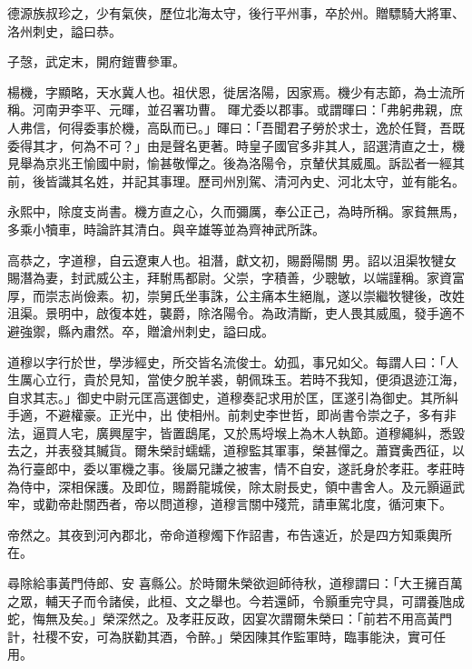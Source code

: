 \begin{pinyinscope}
 德源族叔珍之，少有氣俠，歷位北海太守，後行平州事，卒於州。贈驃騎大將軍、洛州刺史，謚曰恭。



 子愨，武定末，開府鎧曹參軍。



 楊機，字顯略，天水冀人也。祖伏恩，徙居洛陽，因家焉。機少有志節，為士流所稱。河南尹李平、元暉，並召署功曹。
 暉尤委以郡事。或謂暉曰：「弗躬弗親，庶人弗信，何得委事於機，高臥而已。」暉曰：「吾聞君子勞於求士，逸於任賢，吾既委得其才，何為不可？」由是聲名更著。時皇子國官多非其人，詔選清直之士，機見舉為京兆王愉國中尉，愉甚敬憚之。後為洛陽令，京輦伏其威風。訴訟者一經其前，後皆識其名姓，并記其事理。歷司州別駕、清河內史、河北太守，並有能名。



 永熙中，除度支尚書。機方直之心，久而彌厲，奉公正己，為時所稱。家貧無馬，多乘小犢車，時論許其清白。與辛雄等並為齊神武所誅。



 高恭之，字道穆，自云遼東人也。祖潛，獻文初，賜爵陽關
 男。詔以沮渠牧犍女賜潛為妻，封武威公主，拜駙馬都尉。父崇，字積善，少聰敏，以端謹稱。家資富厚，而崇志尚儉素。初，崇舅氏坐事誅，公主痛本生絕胤，遂以崇繼牧犍後，改姓沮渠。景明中，啟復本姓，襲爵，除洛陽令。為政清斷，吏人畏其威風，發手適不避強禦，縣內肅然。卒，贈滄州刺史，謚曰成。



 道穆以字行於世，學涉經史，所交皆名流俊士。幼孤，事兄如父。每謂人曰：「人生厲心立行，貴於見知，當使夕脫羊裘，朝佩珠玉。若時不我知，便須退迹江海，自求其志。」御史中尉元匡高選御史，道穆奏記求用於匡，匡遂引為御史。其所糾手適，不避權豪。正光中，出
 使相州。前刺史李世哲，即尚書令崇之子，多有非法，逼買人宅，廣興屋宇，皆置鴟尾，又於馬埒堠上為木人執節。道穆繩糾，悉毀去之，并表發其贓貨。爾朱榮討蠕蠕，道穆監其軍事，榮甚憚之。蕭寶夤西征，以為行臺郎中，委以軍機之事。後屬兄謙之被害，情不自安，遂託身於孝莊。孝莊時為侍中，深相保護。及即位，賜爵龍城侯，除太尉長史，領中書舍人。及元顥逼武牢，或勸帝赴關西者，帝以問道穆，道穆言關中殘荒，請車駕北度，循河東下。



 帝然之。其夜到河內郡北，帝命道穆燭下作詔書，布告遠近，於是四方知乘輿所在。



 尋除給事黃門侍郎、安
 喜縣公。於時爾朱榮欲迴師待秋，道穆謂曰：「大王擁百萬之眾，輔天子而令諸侯，此桓、文之舉也。今若還師，令顥重完守具，可謂養虺成蛇，悔無及矣。」榮深然之。及孝莊反政，因宴次謂爾朱榮曰：「前若不用高黃門計，社稷不安，可為朕勸其酒，令醉。」榮因陳其作監軍時，臨事能決，實可任用。




\end{pinyinscope}
